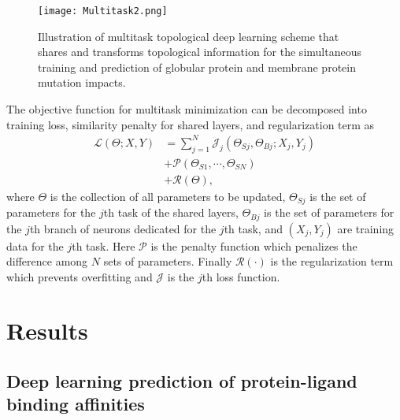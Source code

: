 \documentclass[10pt]{article}
\begin{document}
\begin{figure}[ht]
\begin{center}
\texttt{[image: Multitask2.png]}
\end{center}
\caption{Illustration of  multitask topological deep learning scheme
that shares and transforms topological information for the  simultaneous training and prediction of  
 globular protein and membrane protein mutation impacts. 
}\label{fig:deep_mutlitask}
\end{figure}

 The objective function for multitask minimization can be decomposed into training loss, similarity penalty for shared layers, and regularization term as 
\begin{equation}\label{ObjectiveFunction}
\begin{aligned}
{\mathcal L}(\Theta;X,Y) &= \sum_{j=1}^N{\mathcal J}_j (\Theta_{Sj},\Theta_{Bj};X_{j},Y_{j}) \\
&+ {\mathcal P}(\Theta_{S1},\cdots, \Theta_{SN}) \\
&+ {\mathcal R}(\Theta),
\end{aligned}
\end{equation}
where $\Theta$ is the collection of all parameters to be updated, $\Theta_{Sj}$ is the set of parameters for the $j$th task of the shared layers, $\Theta_{Bj}$ is the set of   parameters for the $j$th branch of neurons dedicated for the $j$th task,    and $(X_{j}, Y_j)$ are training data for the $j$th task. Here  ${\mathcal P}$ is the penalty function which penalizes the difference among $N$ sets of parameters. Finally ${\mathcal R}(\cdot)$ is the regularization term which prevents overfitting and ${\mathcal J}$ is the $j$th loss function.


\section{Results}\label{sec:results}

\subsection{Deep learning prediction of protein-ligand binding affinities}
\end{document}
